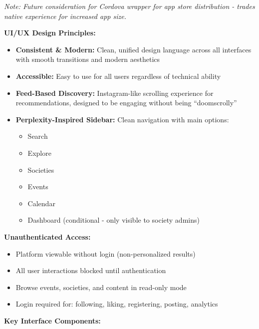 \documentclass[12pt,a4paper]{article}
\begin{document}
\textit{Note: Future consideration for Cordova wrapper for app store distribution - trades native experience for increased app size.}

\textbf{UI/UX Design Principles:}

\begin{itemize}
    \item \textbf{Consistent \& Modern:} Clean, unified design language across all interfaces with smooth transitions and modern aesthetics
    \item \textbf{Accessible:} Easy to use for all users regardless of technical ability
    \item \textbf{Feed-Based Discovery:} Instagram-like scrolling experience for recommendations, designed to be engaging without being ``doomscrolly''
    \item \textbf{Perplexity-Inspired Sidebar:} Clean navigation with main options:
    \begin{itemize}
        \item Search
        \item Explore
        \item Societies
        \item Events
        \item Calendar
        \item Dashboard (conditional - only visible to society admins)
    \end{itemize}
\end{itemize}

\textbf{Unauthenticated Access:}
\begin{itemize}
    \item Platform viewable without login (non-personalized results)
    \item All user interactions blocked until authentication
    \item Browse events, societies, and content in read-only mode
    \item Login required for: following, liking, registering, posting, analytics
\end{itemize}

\textbf{Key Interface Components:}
\end{document}
